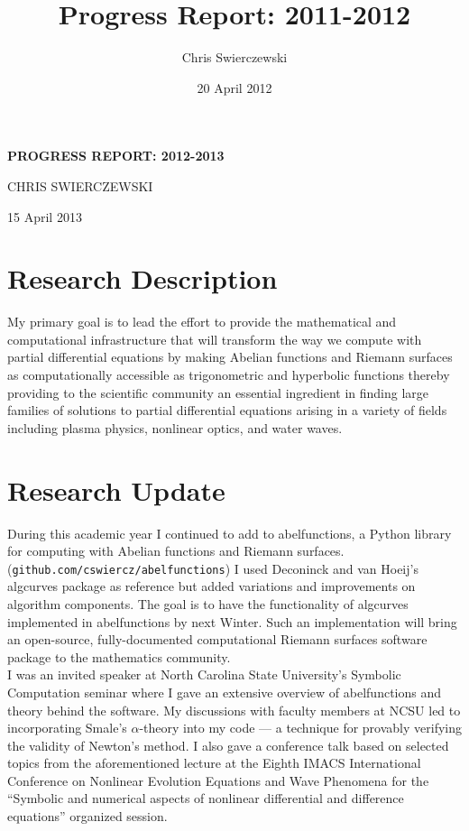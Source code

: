 \documentclass[11pt]{amsart}
\title{Progress Report: 2011-2012}
\author{Chris Swierczewski}
\date{20 April 2012}
\begin{document}
\begin{centering}
\large{\bf{PROGRESS REPORT: 2012-2013}}

\vspace{8pt}

CHRIS SWIERCZEWSKI

\vspace{8pt}

15 April 2013

\vspace{8pt}

\end{centering}

\section*{Research Description}

My primary goal is to lead the effort to provide the mathematical and
computational infrastructure that will transform the way we compute
with partial differential equations by making Abelian functions and
Riemann surfaces as computationally accessible as trigonometric and
hyperbolic functions thereby providing to the scientific community an
essential ingredient in finding large families of solutions to partial
differential equations arising in a variety of fields including plasma
physics, nonlinear optics, and water waves.

\section*{Research Update}

During this academic year I continued to add to {\sc abelfunctions}, a
Python library for computing with Abelian functions and Riemann
surfaces. ({\tt github.com/cswiercz/abelfunctions}) I used Deconinck
and van Hoeij's {\sc algcurves} package as reference but added
variations and improvements on algorithm components. The goal is to
have the functionality of {\sc algcurves} implemented in {\sc
  abelfunctions} by next Winter. Such an implementation will bring an
open-source, fully-documented computational Riemann surfaces software
package to the mathematics community. \\

I was an invited speaker at North Carolina State University's Symbolic
Computation seminar where I gave an extensive overview of {\sc
  abelfunctions} and theory behind the software. My discussions with
faculty members at NCSU led to incorporating Smale's $\alpha$-theory
into my code --- a technique for provably verifying the validity of
Newton's method. I also gave a conference talk based on selected
topics from the aforementioned lecture at the Eighth IMACS
International Conference on Nonlinear Evolution Equations and Wave
Phenomena for the ``Symbolic and numerical aspects of nonlinear
differential and difference equations'' organized session. \\
\end{document}
